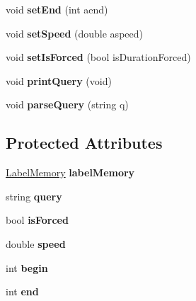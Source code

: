 \begin{DoxyCompactItemize}
\item 
\hypertarget{class_m_a_g_e_1_1_label_abd9e189054153f714d6c85b5c50bb1ba}{void {\bfseries set\-End} (int aend)}\label{class_m_a_g_e_1_1_label_abd9e189054153f714d6c85b5c50bb1ba}

\item 
\hypertarget{class_m_a_g_e_1_1_label_ae307a1bd87eac39162ca659d6984e154}{void {\bfseries set\-Speed} (double aspeed)}\label{class_m_a_g_e_1_1_label_ae307a1bd87eac39162ca659d6984e154}

\item 
\hypertarget{class_m_a_g_e_1_1_label_a5e5c9387f04be05ae215bea33db15bbf}{void {\bfseries set\-Is\-Forced} (bool is\-Duration\-Forced)}\label{class_m_a_g_e_1_1_label_a5e5c9387f04be05ae215bea33db15bbf}

\item 
\hypertarget{class_m_a_g_e_1_1_label_adda3f353ba52de2abdf3773ec976875a}{void {\bfseries print\-Query} (void)}\label{class_m_a_g_e_1_1_label_adda3f353ba52de2abdf3773ec976875a}

\item 
\hypertarget{class_m_a_g_e_1_1_label_ab712ec7ae4d3ebf1ab041845da608719}{void {\bfseries parse\-Query} (string q)}\label{class_m_a_g_e_1_1_label_ab712ec7ae4d3ebf1ab041845da608719}

\end{DoxyCompactItemize}
\subsection*{Protected Attributes}
\begin{DoxyCompactItemize}
\item 
\hypertarget{class_m_a_g_e_1_1_label_a2a35d82d85dbe5640121e4e829b59a52}{\hyperlink{class_m_a_g_e_1_1_label_memory}{Label\-Memory} {\bfseries label\-Memory}}\label{class_m_a_g_e_1_1_label_a2a35d82d85dbe5640121e4e829b59a52}

\item 
\hypertarget{class_m_a_g_e_1_1_label_a2d39a9bcadb698c17ff42d4b999faac8}{string {\bfseries query}}\label{class_m_a_g_e_1_1_label_a2d39a9bcadb698c17ff42d4b999faac8}

\item 
\hypertarget{class_m_a_g_e_1_1_label_afec7c4e82578ed9d9b03878107c223df}{bool {\bfseries is\-Forced}}\label{class_m_a_g_e_1_1_label_afec7c4e82578ed9d9b03878107c223df}

\item 
\hypertarget{class_m_a_g_e_1_1_label_a2944a3886038159fd5d5ab0b798fa93b}{double {\bfseries speed}}\label{class_m_a_g_e_1_1_label_a2944a3886038159fd5d5ab0b798fa93b}

\item 
\hypertarget{class_m_a_g_e_1_1_label_abfbfddb7e4e03a69d7e2648c6f78c69a}{int {\bfseries begin}}\label{class_m_a_g_e_1_1_label_abfbfddb7e4e03a69d7e2648c6f78c69a}

\item 
\hypertarget{class_m_a_g_e_1_1_label_a1902501774c298de2f29709b715e7b01}{int {\bfseries end}}\label{class_m_a_g_e_1_1_label_a1902501774c298de2f29709b715e7b01}

\end{DoxyCompactItemize}



